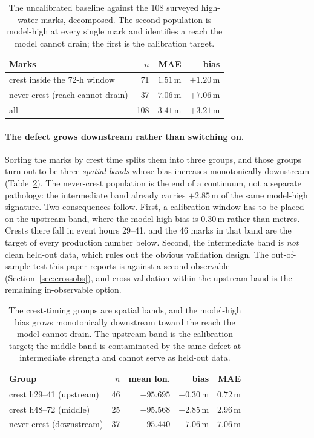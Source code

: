 \documentclass[11pt]{article}
\begin{document}
\begin{table}
\centering\small
\begin{tabular}{@{}lrrr@{}}
\toprule
Marks & $n$ & MAE & bias \\
\midrule
crest inside the 72-h window & 71 & $1.51$\,m & $+1.20$\,m \\
never crest (reach cannot drain) & 37 & $7.06$\,m & $+7.06$\,m \\
all & 108 & $3.41$\,m & $+3.21$\,m \\
\bottomrule
\end{tabular}
\caption{The uncalibrated baseline against the 108 surveyed high-water
marks, decomposed. The second population is model-high at every single
mark and identifies a reach the model cannot drain; the first is the
calibration target.}
\label{tab:baseline}
\end{table}

\paragraph{The defect grows downstream rather than switching on.}
Sorting the marks by crest time splits them into three groups, and
those groups turn out to be three \emph{spatial bands} whose bias
increases monotonically downstream (Table~\ref{tab:bands}). The
never-crest population is the end of a continuum, not a separate
pathology: the intermediate band already carries $+2.85$\,m of the
same model-high signature. Two consequences follow. First, a
calibration window has to be placed on the upstream band, where the
model-high bias is $0.30$\,m rather than metres. Crests there fall in
event hours 29--41,
and the 46 marks in that band are the target of every production
number below. Second, the intermediate band is \emph{not} clean
held-out data, which rules out the obvious validation design. The
out-of-sample test this paper reports is against a second observable
(Section~\ref{sec:crossobs}), and cross-validation within the
upstream band is the remaining in-observable option.

\begin{table}
\centering\small
\begin{tabular}{@{}lrrrr@{}}
\toprule
Group & $n$ & mean lon. & bias & MAE \\
\midrule
crest h29--41 (upstream) & 46 & $-95.695$ & $+0.30$\,m & $0.72$\,m \\
crest h48--72 (middle) & 25 & $-95.568$ & $+2.85$\,m & $2.96$\,m \\
never crest (downstream) & 37 & $-95.440$ & $+7.06$\,m & $7.06$\,m \\
\bottomrule
\end{tabular}
\caption{The crest-timing groups are spatial bands, and the model-high
bias grows monotonically downstream toward the reach the model cannot
drain. The upstream band is the calibration target; the middle band is
contaminated by the same defect at intermediate strength and cannot
serve as held-out data.}
\label{tab:bands}
\end{table}
\end{document}
